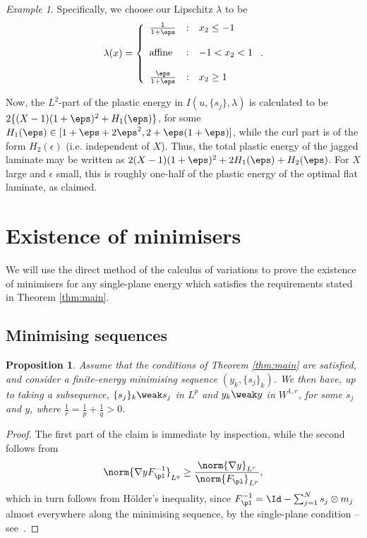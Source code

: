 \documentclass[11pt,reqno]{amsart}
\theoremstyle{plain}
\newtheorem{proposition}[theorem]{Proposition}
\theoremstyle{definition}
\theoremstyle{remark}
\newtheorem{example}{Example}
\begin{document}
\begin{example}
Specifically, we choose our Lipschitz $\lambda$ to be
\[
\lambda(x) =
 \left\{
\begin{array}{lcl}
 \frac{1}{1+\eps} & : & x_2\leq -1\\
   & & \\
 \textrm{affine} & : & -1< x_2 < 1\\
   & & \\ 
 \frac{\eps}{1+\eps} & : & x_2\geq 1 \\
\end{array}
\right..
\]

Now, the $L^2$-part of the plastic energy in $I(u,\{s_j\},\lambda)$ is calculated to be
$2\{(X-1)(1+\eps)^2 + H_1(\eps)\}$, for some $H_1(\eps)\in[1+\eps+2\eps^2, 2+\eps(1+\eps)]$, while the curl part is of the form $H_2(\epsilon)$ (i.e. independent of $X$). Thus, the total plastic energy of the jagged laminate may be written as $2(X-1)(1+\eps)^2 + 2H_1(\eps) + H_2(\eps)$. For $X$ large and $\epsilon$ small, this is roughly one-half of the plastic energy of the optimal flat laminate, as claimed.
\end{example}


\section{Existence of minimisers} \label{sec:existence}
We will use the direct method of the calculus of variations to prove the existence of minimisers for any single-plane energy which satisfies the requirements stated in Theorem \ref{thm:main}.

\subsection{Minimising sequences}
\begin{proposition}\label{hoelder}
Assume that the conditions of Theorem \ref{thm:main} are satisfied, and consider a finite-energy minimising sequence $(y_k, \{s_j\}_k)$. We then have, up to taking a subsequence, $\{s_j\}_k \weak s_j$ in $L^p$ and $y_k \weak y$ in $W^{1,r}$, for some $s_j$ and $y$, where $\frac{1}{r} =  \frac{1}{p} + \frac{1}{q} >0$.
\end{proposition}
\begin{proof}
The first part of the claim is immediate by inspection, while the second follows from 
\[
\norm{\nabla y F_\pl^{-1}}_{L^q} \ge \frac{\norm{\nabla y}_{L^r}}{\norm{F_\pl}_{L^p}},
\]
which in turn follows from H\"older's inequality, since $F_\pl^{-1} = \Id - \sum_{j=1}^N s_j\otimes m_j$ almost everywhere along the minimising sequence, by the single-plane condition -- see~\cite{MM}.
\end{proof}
\end{document}
